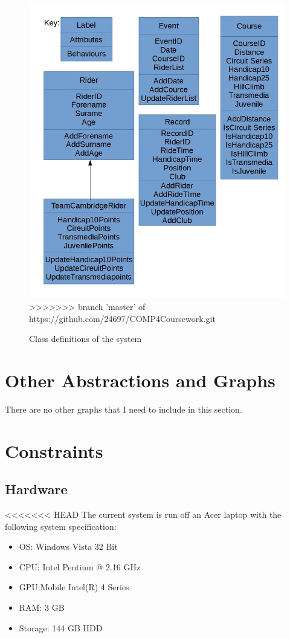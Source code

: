 \begin{figure}[H]
	\includegraphics[width=\textwidth]{./Class.jpg}
>>>>>>> branch 'master' of https://github.com/24697/COMP4Coursework.git
	\caption{Class definitions of the system}
\end{figure}
\section{Other Abstractions and Graphs}
There are no other graphs that I need to include in this section.
\section{Constraints}

\subsection{Hardware}
<<<<<<< HEAD
The current system is run off an Acer laptop with the following system specification:

\begin{itemize}
\item OS: Windows Vista 32 Bit
\item CPU: Intel Pentium @ 2.16 GHz
\item GPU:Mobile Intel(R) 4 Series 
\item RAM: 3 GB
\item Storage: 144 GB HDD
\end{itemize}

